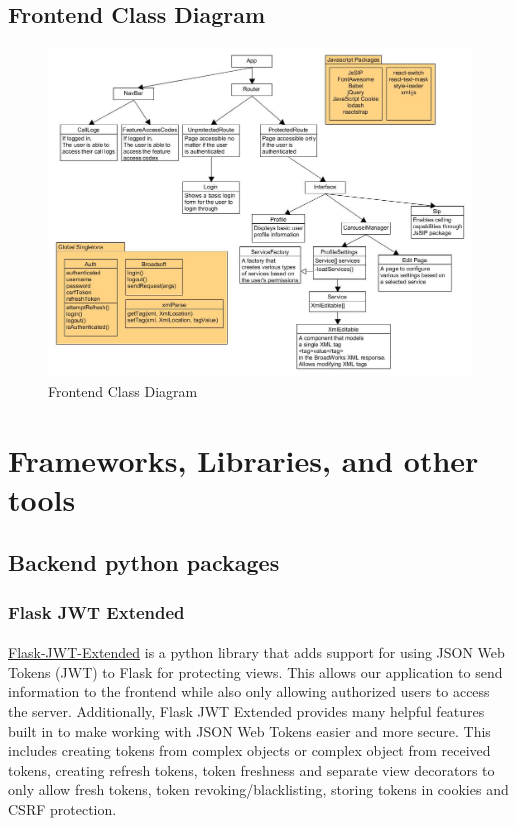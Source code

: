 \documentclass[12pt]{article}
\begin{document}
	\pagebreak

\subsection{Frontend Class Diagram}
	
	\begin{figure}[htb]
	\includegraphics[width=\textwidth]{FrontendClassDiagram.jpg}
	\caption{Frontend Class Diagram}
	\end{figure}


\pagebreak
\section{Frameworks, Libraries, and other tools}

\subsection{Backend python packages}
\subsubsection{Flask JWT Extended}
\paragraph{}
	\href{https://flask-jwt-extended.readthedocs.io/en/latest/}{Flask-JWT-Extended} is a python library that adds support for using JSON Web Tokens (JWT) to Flask for protecting views. This allows our application to send information to the frontend while also only allowing authorized users to access the server. Additionally, Flask JWT Extended provides many helpful features built in to make working with JSON Web Tokens easier and more secure. This includes creating tokens from complex objects or complex object from received tokens, creating refresh tokens, token freshness and separate view decorators to only allow fresh tokens, token revoking/blacklisting, storing tokens in cookies and CSRF protection.
\end{document}
